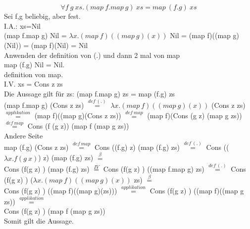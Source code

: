 \documentclass{article}
\theoremstyle{definition}
\begin{document}
	\section{}
	\subsection{}
	\[\forall f\ g\ xs.(map\ f.map\ g)\ xs = map\ (f.g)\ xs\]
	Sei f,g beliebig, aber fest.\\
	I.A.: xs=Nil\\
	(map f.map g) Nil = $\lambda x. (map\ f)((map\ g)(x))$ Nil = (map f)((map g)(Nil)) = (map f)(Nil) = Nil\\
	Anwenden der definition von (.) und dann 2 mal von map \\
	map (f.g) Nil = Nil.\\
	definition von map.\\
	I.V. xs = Cons z zs\\
	Die Aussage gilt für zs: (map f.map g) zs = map (f.g) zs\\
	(map f.map g) (Cons z zs) $\stackrel{def\ (.)}{=}$ $\lambda x. (map\ f)((map\ g)(x))$ (Cons z zs) $\stackrel{applikation}{=}$  (map f)((map g)(Cons z zs)) $\stackrel{def\ map}{=}$ (map f)(Cons (g z) (map g zs)) $\stackrel{def\ map}{=}$ Cons (f (g z)) (map f (map g zs))\\
	Andere Seite\\
	map (f.g) (Cons z zs) $\stackrel{def\ map}{=}$ Cons ((f.g) z) (map (f.g) zs) $\stackrel{def\ (.)}{=}$ Cons (($\lambda x. f(g\ x)$) z) (map (f.g) zs) $\stackrel{\beta}{=}$\\
	Cons (f(g z) ) (map (f.g) zs) $\stackrel{IV}{=}$ Cons (f(g z) ) ((map f.map g) zs) $\stackrel{def\ (.)}{=}$ Cons (f(g z) ) ($\lambda x. (map\ f)((map\ g)(x))$ zs) $\stackrel{\beta}{=}$\\
	Cons (f(g z) ) ((map f)((map g)(zs))) $\stackrel{applikation}{=}$ Cons (f(g z) ) ((map f)((map g zs)) $\stackrel{applikation}{=}$\\
	Cons (f(g z) ) (map f (map g zs))\\
	Somit gilt die Aussage.\\
\end{document}
